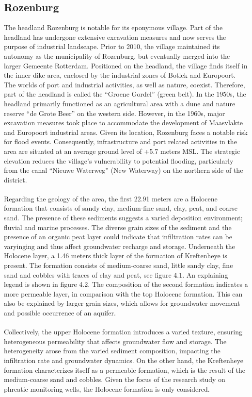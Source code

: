 \subsection{Rozenburg}
The headland Rozenburg is notable for its eponymous village. Part of the headland has undergone extensive excavation measures and now serves the purpose of industrial landscape. Prior to 2010, the village maintained its autonomy as the municipality of Rozenburg, but eventually merged into the larger Gemeente Rotterdam. Positioned on the headland, the village finds itself in the inner dike area, enclosed by the industrial zones of Botlek and Europoort. The worlds of port and industrial activities, as well as nature, coexist. Therefore, part of the headland is called the “Groene Gordel” (green belt). In the 1950s, the headland primarily functioned as an agricultural area with a dune and nature reserve “de Grote Beer” on the western side. However, in the 1960s, major excavation measures took place to accommodate the development of Maasvlakte and Europoort industrial areas. Given its location, Rozenburg faces a notable risk for flood events. Consequently, infrastructure and port related activities in the area are situated at an average ground level of +5.7 meters MSL. The strategic elevation reduces the village’s vulnerability to potential flooding, particularly from the canal “Nieuwe Waterweg” (New Waterway) on the northern side of the district.\\
\\
Regarding the geology of the area, the first 22.91 meters are a Holocene formation that consists of sandy clay, medium-fine sand, clay, peat, and coarse sand. The presence of these sediments suggests a varied deposition environment; fluvial and marine processes. The diverse grain sizes of the sediment and the presence of an organic peat layer could indicate that infiltration rates can be varyinging and thus affect groundwater recharge and storage. Underneath the Holocene layer, a 1.46 meters thick layer of the formation of Kreftenheye is present. The formation consists of medium-coarse sand, little sandy clay, fine sand and cobbles with traces of clay and peat, see figure 4.1. An explaining legend is shown in figure 4.2. The composition of the second formation indicates a more permeable layer, in comparison with the top Holocene formation. This can also be explained by larger grain sizes, which allows for groundwater movement and possible occurrence of an aquifer. \\
\\
Collectively, the upper Holocene formation introduces a varied texture, ensuring heterogeneous permeability that affects groundwater flow and storage. The heterogeneity arose from the varied sediment composition, impacting the infiltration rate and groundwater dynamics. On the other hand, the Kreftenheye formation characterizes itself as a permeable formation, which is the result of the medium-coarse sand and cobbles. Given the focus of the research study on phreatic monitoring wells, the Holocene formation is only considered.\\

